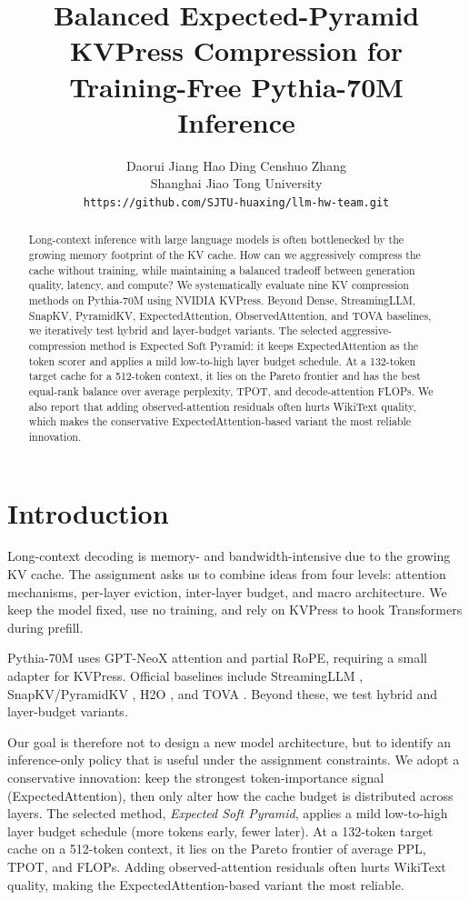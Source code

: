 \documentclass{article}
\title{Balanced Expected-Pyramid KVPress Compression for Training-Free Pythia-70M Inference}
\author{%
  Daorui Jiang \quad Hao Ding \quad Censhuo Zhang\\
  Shanghai Jiao Tong University\\
  \texttt{https://github.com/SJTU-huaxing/llm-hw-team.git}
}
\begin{document}
\maketitle

\begin{abstract}
Long-context inference with large language models is often bottlenecked by the growing memory footprint of the KV cache. How can we aggressively compress the cache without training, while maintaining a balanced tradeoff between generation quality, latency, and compute?  We systematically evaluate nine KV compression methods on Pythia-70M using NVIDIA KVPress. Beyond Dense, StreamingLLM, SnapKV, PyramidKV, ExpectedAttention, ObservedAttention, and TOVA baselines, we iteratively test hybrid and layer-budget variants. The selected aggressive-compression method is Expected Soft Pyramid: it keeps ExpectedAttention as the token scorer and applies a mild low-to-high layer budget schedule. At a 132-token target cache for a 512-token context, it lies on the Pareto frontier and has the best equal-rank balance over average perplexity, TPOT, and decode-attention FLOPs. We also report that adding observed-attention residuals often hurts WikiText quality, which makes the conservative ExpectedAttention-based variant the most reliable innovation.
\end{abstract}


\section{Introduction}

Long-context decoding is memory- and bandwidth-intensive due to the growing KV cache. The assignment asks us to combine ideas from four levels: attention mechanisms, per-layer eviction, inter-layer budget, and macro architecture. We keep the model fixed, use no training, and rely on KVPress \citep{kvpress} to hook Transformers during prefill.

Pythia-70M \citep{biderman2023pythia} uses GPT-NeoX attention and partial RoPE, requiring a small adapter for KVPress. Official baselines include StreamingLLM \citep{xiao2023streamingllm}, SnapKV/PyramidKV \citep{li2024snapkv,cai2024pyramidkv}, H2O \citep{zhang2023h2o}, and TOVA \citep{tova2024}. Beyond these, we test hybrid and layer-budget variants.

Our goal is therefore not to design a new model architecture, but to identify an inference-only policy that is useful under the assignment constraints. We adopt a conservative innovation: keep the strongest token-importance signal (ExpectedAttention), then only alter how the cache budget is distributed across layers. The selected method, \textit{Expected Soft Pyramid}, applies a mild low-to-high layer budget schedule (more tokens early, fewer later). At a 132-token target cache on a 512-token context, it lies on the Pareto frontier of average PPL, TPOT, and FLOPs. Adding observed-attention residuals often hurts WikiText quality, making the ExpectedAttention-based variant the most reliable.
\end{document}
